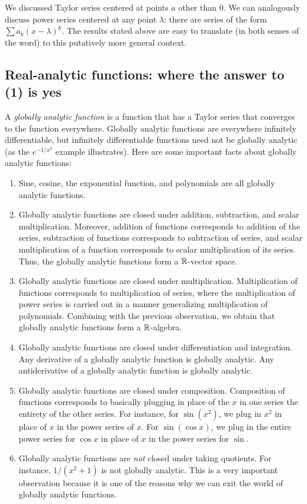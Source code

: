 \documentclass{amsart}
\begin{document}
We discussed Taylor series centered at points $a$ other than $0$. We
can analogously discuss power series centered at any point $\lambda$:
there are series of the form $\sum a_k(x - \lambda)^k$. The results
stated above are easy to translate (in both senses of the word) to
this putatively more general context.

\subsection{Real-analytic functions: where the answer to (1) is yes}

A {\em globally analytic function} is a function that has a Taylor
series that converges to the function everywhere. Globally analytic
functions are everywhere infinitely differentiable, but infinitely
differentiable functions need not be globally analytic (as the
$e^{-1/x^2}$ example illustrates). Here are some important facts about
globally analytic functions:

\begin{enumerate}
\item Sine, cosine, the exponential function, and polynomials are all
  globally analytic functions.
\item Globally analytic functions are closed under addition,
  subtraction, and scalar multiplication. Moreover, addition of
  functions corresponds to addition of the series, subtraction of
  functions corresponds to subtraction of series, and scalar
  multiplication of a function corresponds to scalar multiplication of
  its series. Thus, the globally analytic functions form a $\mathbb{R}$-vector
  space.
\item Globally analytic functions are closed under
  multiplication. Multiplication of functions corresponds to
  multiplication of series, where the multiplication of power series
  is carried out in a manner generalizing multiplication of
  polynomials. Combining with the previous observation, we obtain that
  globally analytic functions form a $\mathbb{R}$-algebra.
\item Globally analytic functions are closed under differentiation and
  integration. Any derivative of a globally analytic function is
  globally analytic. Any antiderivative of a globally analytic
  function is globally analytic.
\item Globally analytic functions are closed under
  composition. Composition of functions corresponds to basically
  plugging in place of the $x$ in one series the entirety of the other
  series. For instance, for $\sin(x^2)$, we plug in $x^2$ in place of
  $x$ in the power series of $x$. For $\sin(\cos x)$, we plug in the
  entire power series for $\cos x$ in place of $x$ in the power series
  for $\sin$.
\item Globally analytic functions are {\em not} closed under taking
  quotients. For instance, $1/(x^2 + 1)$ is not globally analytic. This
  is a very important observation because it is one of the reasons why
  we can exit the world of globally analytic functions.
\end{enumerate}
\end{document}
